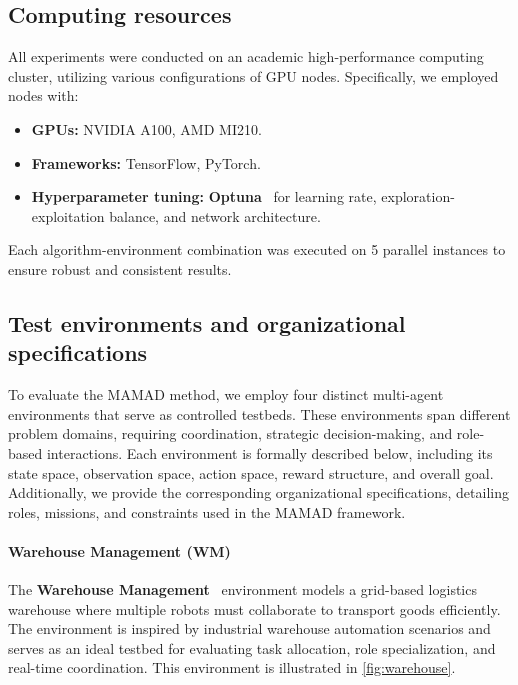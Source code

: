 \documentclass[pdflatex,sn-mathphys-num]{sn-jnl}%
\theoremstyle{thmstyleone}%
\theoremstyle{thmstyletwo}%
\theoremstyle{thmstylethree}%
\begin{document}
\subsection{Computing resources}

All experiments were conducted on an academic high-performance computing cluster, utilizing various configurations of GPU nodes. Specifically, we employed nodes with:
\begin{itemize}
    \item \textbf{GPUs:} NVIDIA A100, AMD MI210.
    \item \textbf{Frameworks:} TensorFlow, PyTorch.
    \item \textbf{Hyperparameter tuning:} \textbf{Optuna}~\cite{akiba2019optuna} for learning rate, exploration-exploitation balance, and network architecture.
\end{itemize}

Each algorithm-environment combination was executed on 5 parallel instances to ensure robust and consistent results.

\subsection{Test environments and organizational specifications}

To evaluate the MAMAD method, we employ four distinct multi-agent environments that serve as controlled testbeds. These environments span different problem domains, requiring coordination, strategic decision-making, and role-based interactions. Each environment is formally described below, including its state space, observation space, action space, reward structure, and overall goal. Additionally, we provide the corresponding organizational specifications, detailing roles, missions, and constraints used in the MAMAD framework.

\paragraph{Warehouse Management (WM)}
The \textbf{Warehouse Management}~\cite{warehouse_management} environment models a grid-based logistics warehouse where multiple robots must collaborate to transport goods efficiently. The environment is inspired by industrial warehouse automation scenarios and serves as an ideal testbed for evaluating task allocation, role specialization, and real-time coordination. This environment is illustrated in \autoref{fig:warehouse}.
\end{document}
